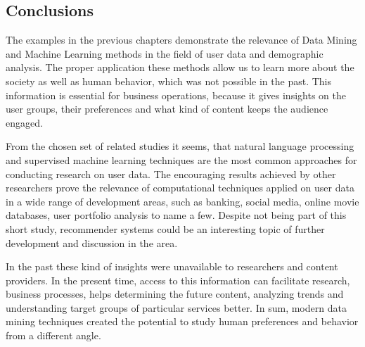 \subsection{Conclusions} %
The examples in the previous chapters demonstrate the relevance of Data Mining and Machine Learning methods in the field of user data and demographic analysis. The proper application these methods allow us to learn more about the society as well as human behavior, which was not possible in the past. This information is essential for business operations, because it gives insights on the user groups, their preferences and what kind of content keeps the audience engaged. 

From the chosen set of related studies it seems, that natural language processing and supervised machine learning techniques are the most common approaches for conducting research on user data. The encouraging results achieved by other researchers prove the relevance of computational techniques applied on user data in a wide range of development areas, such as banking, social media, online movie databases, user portfolio analysis to name a few. Despite not being part of this short study, recommender systems could be an interesting topic of further development and discussion in the area.  

In the past these kind of insights were unavailable to researchers and content providers. In the present time, access to this information can facilitate research, business processes, helps determining the future content, analyzing trends and understanding target groups of particular services better. In sum, modern data mining techniques created the potential to study human preferences and behavior from a different angle.

